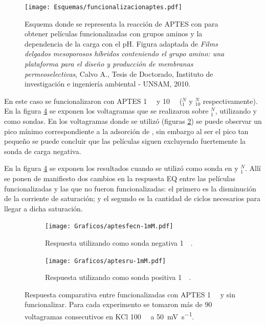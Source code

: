 				 \begin{figure}[ht!]	
					\centering
			 	    \texttt{[image: Esquemas/funcionalizacionaptes.pdf]}
			        \caption[Funcionalización con APTES 1mM]{Esquema donde se representa la reacción de APTES con \pdmZ\space para obtener películas funcionalizadas con grupos aminos y la dependencia de la carga con el pH. Figura adaptada de \textit{Films delgados mesoporosos híbridos conteniendo el grupo amino: una plataforma para el diseño y producción de membranas permeoselectivas}, Calvo A., Tesis de Doctorado, Instituto de investigación e ingeniería ambiental - UNSAM, 2010.\cite{Calvo20210}}
			        \label{esq:aptes-esquema}
			      	\end{figure}

			\pagebreak

			En este caso se funcionalizaron \pdmZ\space con APTES \SI{1}{\milli\Molar} y \SI{10}{\milli\Molar} (\pdmZ$^N_{1}$ y \pdmZ$^N_{10}$ respectivamente). En la figura \ref{fig:aptes1mM-vc} se exponen los voltagramas que se realizaron sobre \pdmZ$^N_{1}$, utilizando \fe\space y \ru\space como sondas. En los voltagramas donde se utilizó \fe\space (figuras \ref{fig:aptes1mM-vc-fe}) se puede observar un pico mínimo correspondiente a la adsorción de \fe, sin embargo al ser el pico tan pequeño se puede concluir que las películas siguen excluyendo fuertemente la sonda de carga negativa.

		   	En la figura \ref{fig:aptes1mM-vc} se exponen los resultados cuando se utilizó \ru\space como sonda en \pdmZ\space y \pdmZ$^N_1$. Allí se ponen de manifiesto dos cambios en la respuesta EQ entre las películas funcionalizadas y las que no fueron funcionalizadas: el primero es la disminución de la corriente de saturación; y el segundo es la cantidad de ciclos necesarios para llegar a dicha saturación.

		    	 \begin{figure}[ht]	
					\begin{subfigure}[t]{0.495\textwidth}
			 	    \texttt{[image: Graficos/aptesfecn-1mM.pdf]}
			        \caption{Respuesta utilizando como sonda negativa \ferroferri\space \SI{1}{\milli\Molar}.}
			        \label{fig:aptes1mM-vc-fe}
			        \end{subfigure}
			        \begin{subfigure}[t]{0.495\textwidth}
			 	    \texttt{[image: Graficos/aptesru-1mM.pdf]}
			        \caption{Respuesta utilizando como sonda positiva \aminorutenio\space \SI{1}{\milli\Molar}.}
			        \label{fig:aptes1mM-vc-ru}
			        \end{subfigure}
			        \caption[Voltagramas de \pdmZ$^P_3$ con \aminorutenio\space y \ferroferri]{Respuesta comparativa entre \pdmZ\space funcionalizadas con APTES \SI{1}{\milli\Molar} y sin funcionalizar. Para cada experimento se tomaron más de 90 voltagramas consecutivos en KCl \SI{100}{\milli\Molar} a \SI{50}{\milli\volt\per\second}.}
			        \label{fig:aptes1mM-vc}
			      	\end{figure}

